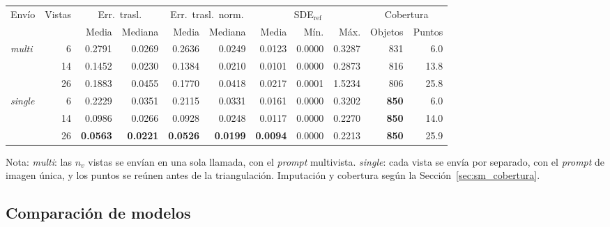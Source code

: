 \begin{table}[H]
\begin{tabular*}{\textwidth}{@{\extracolsep{\fill}}lrrrrrrrrrr@{}}
\toprule
\multirow{2}{*}{Envío} & \multirow{2}{*}{Vistas} & \multicolumn{2}{c}{Err.\ trasl.} & \multicolumn{2}{c}{Err.\ trasl.\ norm.} & \multicolumn{3}{c}{SDE$_{\mathrm{ref}}$} & \multicolumn{2}{c}{Cobertura} \\
\cmidrule(lr){3-4} \cmidrule(lr){5-6} \cmidrule(lr){7-9} \cmidrule(lr){10-11}
 &  & Media & Mediana & Media & Mediana & Media & Mín. & Máx. & Objetos & Puntos \\
\midrule
\multirow{3}{*}{\textit{multi}} & 6 & 0.2791 & 0.0269 & 0.2636 & 0.0249 & 0.0123 & 0.0000 & 0.3287 & 831 & 6.0 \\
 & 14 & 0.1452 & 0.0230 & 0.1384 & 0.0210 & 0.0101 & 0.0000 & 0.2873 & 816 & 13.8 \\
 & 26 & 0.1883 & 0.0455 & 0.1770 & 0.0418 & 0.0217 & 0.0001 & 1.5234 & 806 & 25.8 \\
\midrule
\multirow{3}{*}{\textit{single}} & 6 & 0.2229 & 0.0351 & 0.2115 & 0.0331 & 0.0161 & 0.0000 & 0.3202 & \textbf{850} & 6.0 \\
 & 14 & 0.0986 & 0.0266 & 0.0928 & 0.0248 & 0.0117 & 0.0000 & 0.2270 & \textbf{850} & 14.0 \\
 & 26 & \textbf{0.0563} & \textbf{0.0221} & \textbf{0.0526} & \textbf{0.0199} & \textbf{0.0094} & 0.0000 & 0.2213 & \textbf{850} & 25.9 \\
\bottomrule
\end{tabular*}

\vspace{1.5ex}
\begin{minipage}{\textwidth}
Nota: \textit{multi}: las $n_v$ vistas se envían en una sola llamada, con el \textit{prompt} multivista. \textit{single}: cada vista se envía por separado, con el \textit{prompt} de imagen única, y los puntos se reúnen antes de la triangulación. Imputación y cobertura según la Sección~\ref{sec:sm_cobertura}.
\end{minipage}
\end{table}







\newpage
\subsection{Comparación de modelos}

